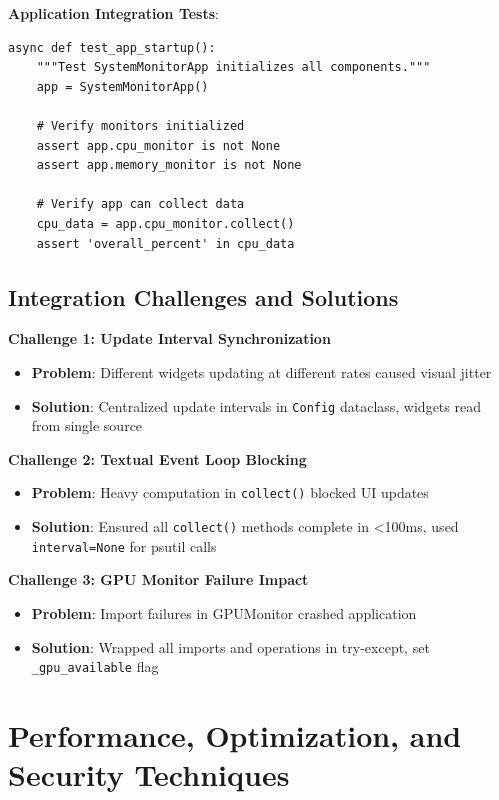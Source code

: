 \documentclass[12pt,a4paper,oneside]{report}
\begin{document}
\textbf{Application Integration Tests}:
\begin{lstlisting}
async def test_app_startup():
    """Test SystemMonitorApp initializes all components."""
    app = SystemMonitorApp()
    
    # Verify monitors initialized
    assert app.cpu_monitor is not None
    assert app.memory_monitor is not None
    
    # Verify app can collect data
    cpu_data = app.cpu_monitor.collect()
    assert 'overall_percent' in cpu_data
\end{lstlisting}

\subsection{Integration Challenges and Solutions}

\textbf{Challenge 1: Update Interval Synchronization}
\begin{itemize}
    \item \textbf{Problem}: Different widgets updating at different rates caused visual jitter
    \item \textbf{Solution}: Centralized update intervals in \texttt{Config} dataclass, widgets read from single source
\end{itemize}

\textbf{Challenge 2: Textual Event Loop Blocking}
\begin{itemize}
    \item \textbf{Problem}: Heavy computation in \texttt{collect()} blocked UI updates
    \item \textbf{Solution}: Ensured all \texttt{collect()} methods complete in <100ms, used \texttt{interval=None} for psutil calls
\end{itemize}

\textbf{Challenge 3: GPU Monitor Failure Impact}
\begin{itemize}
    \item \textbf{Problem}: Import failures in GPUMonitor crashed application
    \item \textbf{Solution}: Wrapped all imports and operations in try-except, set \texttt{\_gpu\_available} flag
\end{itemize}

\section{Performance, Optimization, and Security Techniques}
\label{sec:performance-optimization}
\end{document}
